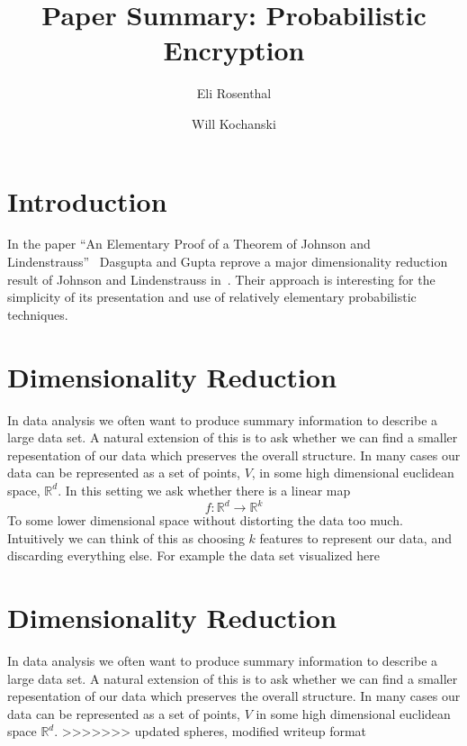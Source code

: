 \documentclass[11pt]{article}
\author{Eli Rosenthal \and Will Kochanski}
\date{}
\title{Paper Summary: Probabilistic Encryption}
\newcommand{\arr}{\rightarrow}
\newcommand{\R}{\mathbb{R}}
\begin{document}
\maketitle
\section{Introduction}
In the paper ``An Elementary Proof of a Theorem of Johnson and
Lindenstrauss''~\cite{mainpaper}  Dasgupta and Gupta reprove a major
dimensionality reduction result of Johnson and Lindenstrauss in~\cite{oldpaper}.
Their approach is interesting for the simplicity of its presentation and use of
relatively elementary probabilistic techniques.

\section{Dimensionality Reduction}
In data analysis we often want to produce summary information to describe a large data set. A natural extension of this is to ask whether we can find a smaller repesentation of our data which preserves the overall structure. In many cases our data can be represented as a set of points, $V$, in some high dimensional euclidean space, $\R^d$. In this setting we ask whether there is a linear map
\[ f : \R^d \arr \R^k \]
To some lower dimensional space without distorting the data too much. Intuitively we can think of this as choosing $k$ features to represent our data, and discarding everything else. For example the data set visualized here

\section{Dimensionality Reduction}
In data analysis we often want to produce summary information to describe a
large data set. A natural extension of this is to ask whether we can find a
smaller repesentation of our data which preserves the overall structure. In many
cases our data can be represented as a set of points, $V$ in some high
dimensional euclidean space $\R^d$.
>>>>>>> updated spheres, modified writeup format
\end{document}
